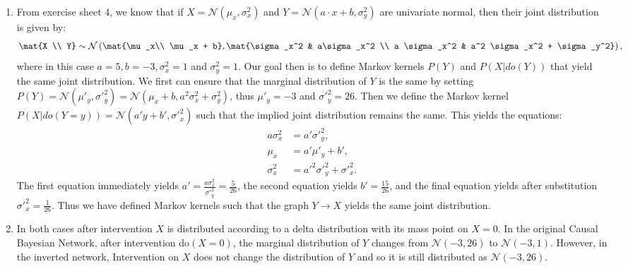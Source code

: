 \begin{gradedsolution}
  \begin{enumerate}
    \item From exercise sheet 4, we know that if $X=\mathcal{N}(\mu_x,\sigma^2_x)$ and $Y= \mathcal{N}(a\cdot x+b, \sigma^2_y)$ are univariate normal, then their joint distribution is given by:
    \begin{align*}
      \mat{X \\ Y} \sim \mathcal{N}\left( \mat{\mu_x\\ \mu_x + b}, \mat{\sigma_x^2 & a\sigma_x^2 \\ a \sigma_x^2 & a^2 \sigma_x^2 + \sigma_y^2}\right),
    \end{align*}
    where in this case $a=5, b = -3, \sigma^2_x=1$ and $\sigma^2_y=1$. Our goal then is to define Markov kernels $P(Y)$ and $P(X|do(Y))$ that yield the same joint distribution. We first can ensure that the marginal distribution of $Y$ is the same by setting $P(Y) = \mathcal{N}(\mu'_y, \sigma'^2_y) = \mathcal{N}(\mu_x + b, a^2 \sigma_x^2 + \sigma_y^2)$, thus $\mu'_y=-3$ and $\sigma'^2_y=26$. Then we define the Markov kernel $P(X|do(Y=y)) = \mathcal{N}(a'y + b', \sigma'^2_x)$ such that the implied joint distribution remains the same. This yields the equations:
    \begin{align*}
      a\sigma_x^2 &= a' \sigma'^2_y,\\
      \mu_x &= a' \mu'_y + b',\\
      \sigma^2_x &= a'^2 \sigma'^2_y + \sigma'^2_x.
    \end{align*}
    The first equation immediately yields $a' = \frac{a\sigma_x^2}{\sigma'^2_y} = \frac{5}{26}$, the second equation yields $b' = \frac{15}{26}$, and the final equation yields after substitution $\sigma'^2_x = \frac{1}{26}$. Thus we have defined Markov kernels such that the graph $Y \rightarrow X$ yields the same joint distribution.
    \item In both cases after intervention $X$ is distributed according to a delta distribution with its mass point on $X=0$. In the original Causal Bayesian Network, after intervention do$(X=0)$, the marginal distribution of $Y$ changes from $\mathcal{N}(-3,26)$ to $\mathcal{N}(-3,1)$. However, in the inverted network, Intervention on $X$ does not change the distribution of $Y$ and so it is still distributed as $\mathcal{N}(-3,26)$.
  \end{enumerate}
\end{gradedsolution}

